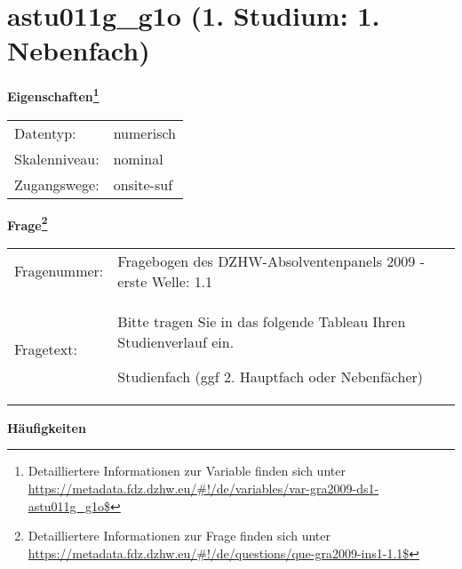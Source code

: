 
    \setcounter{footnote}{0}

    \vspace*{-1.8cm}
	\section{astu011g\_g1o (1. Studium: 1. Nebenfach)}
	\label{section:astu011g_g1o}



    \vspace*{0.5cm}
    \noindent\textbf{Eigenschaften\footnote{Detailliertere Informationen zur Variable finden sich unter
		\url{https://metadata.fdz.dzhw.eu/\#!/de/variables/var-gra2009-ds1-astu011g_g1o$}}}\\
	\begin{tabularx}{\hsize}{@{}lX}
	Datentyp: & numerisch \\
	Skalenniveau: & nominal \\
	Zugangswege: &
	  onsite-suf
 \\
    \end{tabularx}



				\vspace*{0.5cm}
                \noindent\textbf{Frage\footnote{Detailliertere Informationen zur Frage finden sich unter
		              \url{https://metadata.fdz.dzhw.eu/\#!/de/questions/que-gra2009-ins1-1.1$}}}\\
				\begin{tabularx}{\hsize}{@{}lX}
					Fragenummer: &
					  Fragebogen des DZHW-Absolventenpanels 2009 - erste Welle:
					  1.1
 \\
					Fragetext: & Bitte tragen Sie in das folgende Tableau Ihren Studienverlauf ein.\par  Studienfach (ggf 2. Hauptfach oder Nebenfächer) \\
				\end{tabularx}





        		\vspace*{0.5cm}
                \noindent\textbf{Häufigkeiten}

